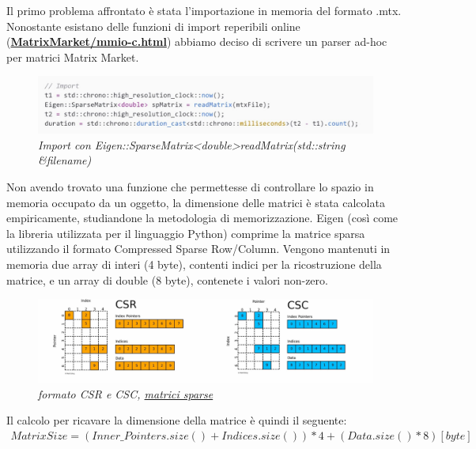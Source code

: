 \documentclass[a4paper,12pt]{article}
\begin{document}
\noindent Il primo problema affrontato è stata l’importazione in memoria del formato .mtx. Nonostante esistano delle funzioni di import reperibili online (\href{https://math.nist.gov/MatrixMarket/mmio-c.html}{\textbf{MatrixMarket/mmio-c.html}}) abbiamo deciso di scrivere un parser ad-hoc per matrici Matrix Market. 
\bigskip

\begin{figure}[H]
\centering
\includegraphics[width=0.85\linewidth]{img/c++1.jpg}
\caption{\textit{Import con Eigen::SparseMatrix\textless double\textgreater readMatrix(std::string \&filename)}}
\end{figure}

\noindent Non avendo trovato una funzione che permettesse di controllare lo spazio in memoria occupato da un oggetto, la dimensione delle matrici è stata calcolata empiricamente, studiandone la metodologia di memorizzazione. Eigen (così come la libreria utilizzata per il linguaggio Python) comprime la matrice sparsa utilizzando il formato Compressed Sparse Row/Column. Vengono mantenuti in memoria due array di interi (4 byte), contenti indici per la ricostruzione della matrice, e un array di double (8 byte), contenete i valori non-zero.

\begin{figure}[H]
\centering
\includegraphics[width=1 \linewidth]{img/c++2.jpg}
\caption{\textit{formato CSR e CSC, \href{https://matteding.github.io/2019/04/25/sparse-matrices/} {matrici sparse}}}
\end{figure}

\fancyhf{}
\rhead{\leftmark}
\fancyfoot[C]{\thepage}

\noindent Il calcolo per ricavare la dimensione della matrice è quindi il seguente:
\begin{align*}
MatrixSize = (Inner\_Pointers.size() + Indices.size()) * 4 + (Data.size() * 8) [byte]
\end{align*}
\end{document}
